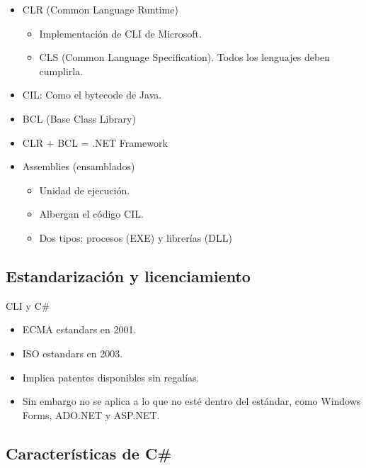 \documentclass{beamer}
\begin{document}
\begin{frame}
  \begin{itemize}
    \item CLR (Common Language Runtime)
      \begin{itemize}
        \item Implementación de CLI de Microsoft.
        \item CLS (Common Language Specification). Todos los lenguajes deben
          cumplirla.
      \end{itemize}

    \item CIL: Como el bytecode de Java.
    \item BCL (Base Class Library)
    \item CLR + BCL = .NET Framework

    \item Assemblies (ensamblados)
      \begin{itemize}
        \item Unidad de ejecución.
        \item Albergan el código CIL.
        \item Dos tipos: procesos (EXE) y librerías (DLL)
      \end{itemize}
  \end{itemize}
\end{frame}


\subsection{Estandarización y licenciamiento}

\begin{frame}{CLI y C\#}
  \begin{itemize}
    \item ECMA estandars en 2001.
    \item ISO estandars en 2003.
    \item Implica patentes disponibles sin regalías.
    \item Sin embargo no se aplica a lo que no esté dentro del estándar,
      como Windows Forms, ADO.NET y ASP.NET.
  \end{itemize}
\end{frame}


\subsection{Características de C\#}
\end{document}
